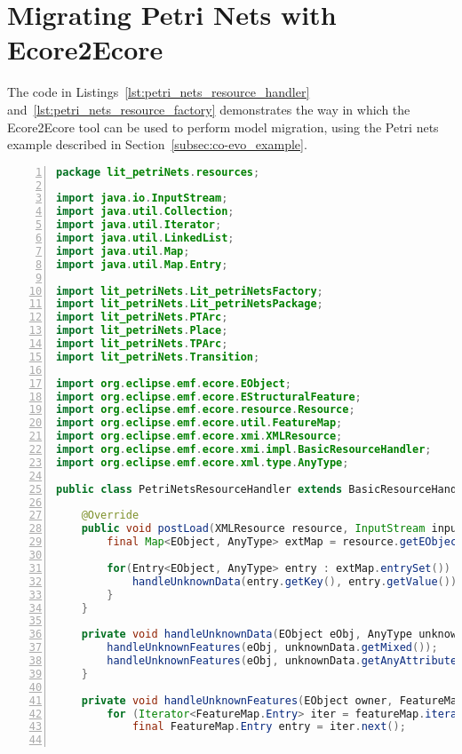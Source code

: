 
\section{Migrating Petri Nets with Ecore2Ecore}
\label{sec:ecore2ecore_listings}
The code in Listings~\ref{lst:petri_nets_resource_handler} and~\ref{lst:petri_nets_resource_factory} demonstrates the way in which the Ec\-o\-re2Ec\-o\-re tool \cite{hussey06advanced} can be used to perform model migration, using the Petri nets example described in Section~\ref{subsec:co-evo_example}. 

\begin{lstlisting}[basicstyle=\ttfamily\footnotesize, flexiblecolumns=true, numbers=left, nolol=true, caption=Resource handler for migrating Petri net models., label=lst:petri_nets_resource_handler, language=Java, tabsize=2]
package lit_petriNets.resources;

import java.io.InputStream;
import java.util.Collection;
import java.util.Iterator;
import java.util.LinkedList;
import java.util.Map;
import java.util.Map.Entry;

import lit_petriNets.Lit_petriNetsFactory;
import lit_petriNets.Lit_petriNetsPackage;
import lit_petriNets.PTArc;
import lit_petriNets.Place;
import lit_petriNets.TPArc;
import lit_petriNets.Transition;

import org.eclipse.emf.ecore.EObject;
import org.eclipse.emf.ecore.EStructuralFeature;
import org.eclipse.emf.ecore.resource.Resource;
import org.eclipse.emf.ecore.util.FeatureMap;
import org.eclipse.emf.ecore.xmi.XMLResource;
import org.eclipse.emf.ecore.xmi.impl.BasicResourceHandler;
import org.eclipse.emf.ecore.xml.type.AnyType;

public class PetriNetsResourceHandler extends BasicResourceHandler {

	@Override
	public void postLoad(XMLResource resource, InputStream inputStream, Map<?, ?> options) {
		final Map<EObject, AnyType> extMap = resource.getEObjectToExtensionMap();
		
		for(Entry<EObject, AnyType> entry : extMap.entrySet()) {
			handleUnknownData(entry.getKey(), entry.getValue());
		}
	}

	private void handleUnknownData(EObject eObj, AnyType unknownData) {
		handleUnknownFeatures(eObj, unknownData.getMixed());
		handleUnknownFeatures(eObj, unknownData.getAnyAttribute());
	}

	private void handleUnknownFeatures(EObject owner, FeatureMap featureMap) {
		for (Iterator<FeatureMap.Entry> iter = featureMap.iterator(); iter.hasNext();) {
			final FeatureMap.Entry entry = iter.next();
			

\end{lstlisting}
